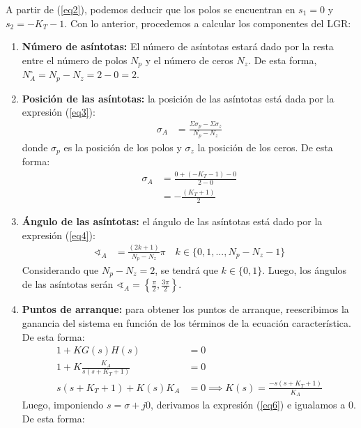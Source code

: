 \documentclass[
  11pt,
  letterpaper,
   addpoints,
   answers
  ]{exam}
\begin{document}
\begin{questions}
\begin{solution}
    A partir de (\ref{eq2}), podemos deducir que los polos se encuentran en \( s_1 = 0 \) y \( s_2 = -K_T -1 \). Con lo anterior, procedemos a calcular los componentes del LGR:
    \begin{enumerate}
        \item \textbf{Número de asíntotas: }El número de asíntotas estará dado por la resta entre el número de polos \( N_p \) y el número de ceros \( N_z \). De esta forma, \( N^\circ_A = N_p - N_z = 2 - 0 = 2 \).\\
        \item \textbf{Posición de las asíntotas: } la posición de las asíntotas está dada por la expresión (\ref{eq3}):
        \begin{align}
            \sigma_A &= \frac{\Sigma \sigma_p - \Sigma \sigma_z}{N_p - N_z} \label{eq3}
        \end{align}
        donde \( \sigma_p \) es la posición de los polos y \( \sigma_z \) la posición de los ceros. De esta forma:
        \begin{align}
            \sigma_A &= \frac{0 + (-K_T - 1) - 0}{2 - 0} \nonumber\\
            &= -\frac{(K_T + 1)}{2} \nonumber
        \end{align}
        \item \textbf{Ángulo de las asíntotas: } el ángulo de las asíntotas está dado por la expresión (\ref{eq4}):
        \begin{align}
            \sphericalangle_A &= \frac{(2k+1)}{N_p - N_z}\pi \quad k \in \{0,1,...,N_p - N_z - 1 \} \label{eq4}
        \end{align}
        Considerando que \( N_p - N_z = 2 \), se tendrá que \( k \in \{0,1\} \). Luego, los ángulos de las asíntotas serán \( \sphericalangle_A = \left\{\frac{\pi}{2},\frac{3\pi}{2}\right\} \).
        \item \textbf{Puntos de arranque: }para obtener los puntos de arranque, reescribimos la ganancia del sistema en función de los términos de la ecuación característica. De esta forma:
        \begin{align}
            1 + KG(s)H(s) &= 0 \nonumber\\
            1 + K\frac{K_A}{s(s+K_T+1)} &= 0 \nonumber\\
            s(s+K_T+1) + K(s)K_A &= 0 \implies  \boxed{K(s) = \frac{-s(s+K_T+1)}{K_A}} \label{eq5}
        \end{align}
        Luego, imponiendo \( s = \sigma + j0 \), derivamos la expresión (\ref{eq6}) e igualamos a 0. De esta forma:

\end{enumerate}
\end{solution}
\end{questions}
\end{document}
